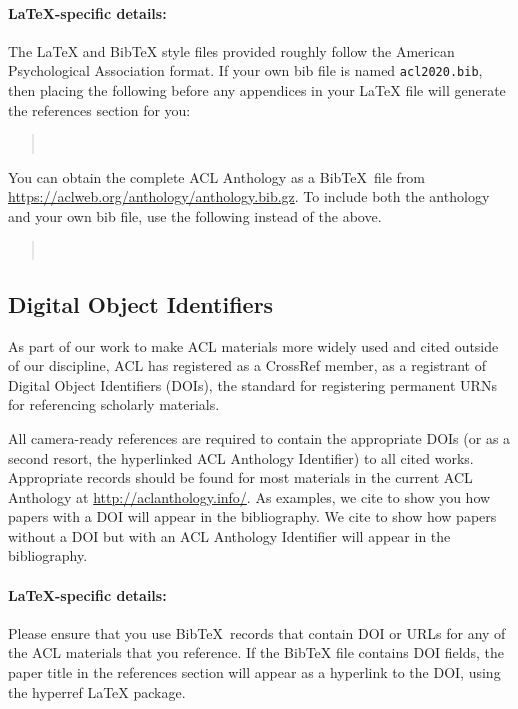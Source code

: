 \documentclass[11pt,a4paper]{article}
\begin{document}
\paragraph{\LaTeX-specific details:}
The \LaTeX{} and Bib\TeX{} style files provided roughly follow the American Psychological Association format.
If your own bib file is named \texttt{\small acl2020.bib}, then placing the following before any appendices in your \LaTeX{}  file will generate the references section for you:
\begin{quote}\small
  \verb||\\
  \verb||
\end{quote}

You can obtain the complete ACL Anthology as a Bib\TeX\ file from \url{https://aclweb.org/anthology/anthology.bib.gz}.
To include both the anthology and your own bib file, use the following instead of the above.
\begin{quote}\small
  \verb||\\
  \verb||
\end{quote}


\subsection{Digital Object Identifiers}
As part of our work to make ACL materials more widely used and cited outside of our discipline, ACL has registered as a CrossRef member, as a registrant of Digital Object Identifiers (DOIs), the standard for registering permanent URNs for referencing scholarly materials.

All camera-ready references are required to contain the appropriate DOIs (or as a second resort, the hyperlinked ACL Anthology Identifier) to all cited works.
Appropriate records should be found for most materials in the current ACL Anthology at \url{http://aclanthology.info/}.
As examples, we cite \citep{goodman-etal-2016-noise} to show you how papers with a DOI will appear in the bibliography.
We cite \citep{harper-2014-learning} to show how papers without a DOI but with an ACL Anthology Identifier will appear in the bibliography.

\paragraph{\LaTeX-specific details:}
Please ensure that you use Bib\TeX\ records that contain DOI or URLs for any of the ACL materials that you reference.
If the Bib\TeX{} file contains DOI fields, the paper title in the references section will appear as a hyperlink to the DOI, using the hyperref \LaTeX{} package.
\end{document}

